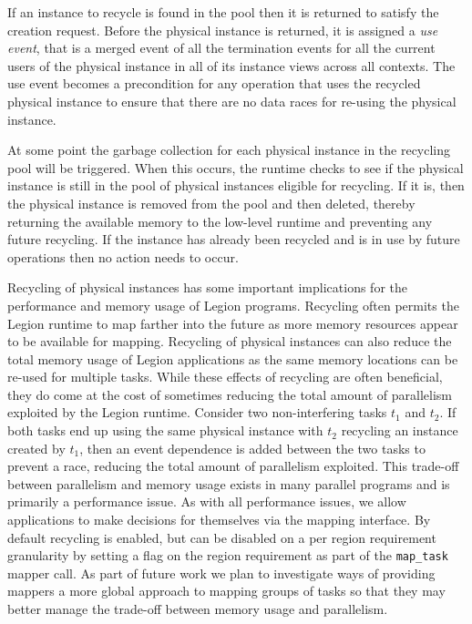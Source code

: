 If an instance to recycle is found in the pool then it
is returned to satisfy the creation request. Before the 
physical instance is returned, it is assigned a 
{\em use event}, that is a merged event of all the 
termination events for all the current users of the physical 
instance in all of its instance views across all contexts. 
The use event becomes a precondition for any operation that 
uses the recycled physical instance to ensure that there are 
no data races for re-using the physical instance.

At some point the garbage collection for each physical
instance in the recycling pool will be triggered.  When this
occurs, the runtime checks to see if the physical instance
is still in the pool of physical instances eligible for
recycling. If it is, then the physical instance is removed
from the pool and then deleted, thereby returning the available
memory to the low-level runtime and preventing any future
recycling.  If the instance has already been recycled and
is in use by future operations then no action needs to occur.

Recycling of physical instances has some important implications
for the performance and memory usage of Legion programs. 
Recycling often permits the Legion runtime to map farther into 
the future as more memory resources appear to be available for 
mapping. Recycling of physical instances can also reduce the total 
memory usage of Legion applications as the same memory locations 
can be re-used for multiple tasks. While these effects of recycling
are often beneficial, they do come at the cost of sometimes
reducing the total amount of parallelism exploited by the
Legion runtime. Consider two non-interfering tasks $t_1$ 
and $t_2$.  If both tasks end up using the same physical 
instance with $t_2$ recycling an instance created by $t_1$,
then an event dependence is added between the two tasks
to prevent a race, reducing the total amount of parallelism
exploited. This trade-off between parallelism and memory
usage exists in many parallel programs and is primarily a
performance issue. As with all performance issues, we allow
applications to make decisions for themselves via the mapping
interface. By default recycling is enabled, but can be disabled
on a per region requirement granularity by setting a flag
on the region requirement as part of the {\tt map\_task}
mapper call. As part of future work we plan to investigate ways
of providing mappers a more global approach to mapping groups
of tasks so that they may better manage the trade-off between
memory usage and parallelism.

